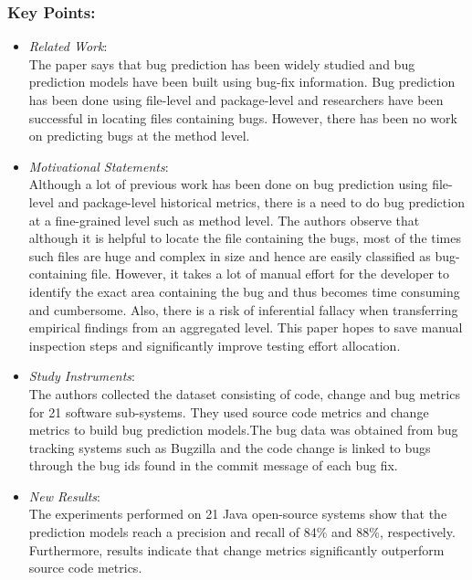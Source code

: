 \documentclass{sig-alternate-05-2015}
\begin{document}
\subsubsection{Key Points:}
\begin{itemize}
\item \emph{Related Work}: \\
The paper says that bug prediction has been widely studied and bug prediction models have been built using bug-fix information. Bug prediction has been done using file-level and package-level and researchers have been successful in locating files containing bugs. However, there has been no work on predicting bugs at the method level.
\item \emph{Motivational Statements}: \\
Although a lot of previous work has been done on bug prediction using file-level and package-level historical metrics, there is a need to do bug prediction at a fine-grained level such as method level. The authors observe that although it is helpful to locate the file containing the bugs, most of the times such files are huge and complex in size and hence are easily classified as bug-containing file. However, it takes a lot of manual effort for the developer to identify the exact area containing the bug and thus becomes time consuming and cumbersome. Also, there is a risk of inferential fallacy when transferring empirical findings from an aggregated level. This paper hopes to save manual inspection steps and significantly improve testing effort allocation.
\item \emph{Study Instruments}: \\
The authors collected the dataset consisting of code, change and bug metrics for 21 software sub-systems. They used source code metrics and change metrics to build bug prediction models.The bug data was obtained from bug tracking systems such as Bugzilla and the code change is linked to bugs through the bug ids found in the commit message of each bug fix.
\item \emph{New Results}: \\
The experiments performed on 21 Java open-source systems show that the prediction models reach a precision and recall of 84\% and 88\%, respectively. Furthermore, results indicate that change metrics significantly outperform source code metrics.
\end{itemize}
\end{document}
